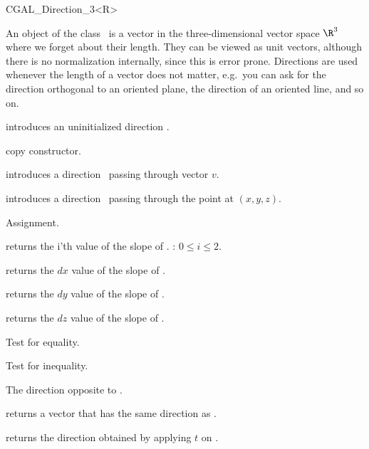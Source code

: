 
\begin {classtemplate} {CGAL_Direction_3<R>}

An object of the class \classname\ is a vector in the three-dimensional 
vector space $\R^3$  where we forget about their length. They can be
viewed as unit vectors, although there is no normalization internally,
since this is error prone.  Directions are used whenever the length of
a vector does not matter, e.g.\ you can ask for the direction
orthogonal to an oriented plane, the direction of an oriented line,
and so on. 

\creation
{}


\hidden {}
             {introduces an uninitialized direction \var.}

\hidden {}
 	    {copy constructor.}

	    {introduces a direction \var\ passing through vector $v$.}

            {introduces a direction \var\ passing through the point 
             at $(x, y, z)$.}


\operations
\threecolumns{5cm}{4cm}

\hidden {}
        {Assignment.}

       {returns the i'th value of the slope of \var.
        \precond: $0 \leq i \leq 2$.}

       {returns the $dx$ value of the slope of \var.}

       {returns the $dy$ value of the slope of \var.}

       {returns the $dz$ value of the slope of \var.}


       {Test for equality.}

       {Test for inequality.}


       {The direction opposite to \var.}

       {returns a vector that has the same direction as \var.}

       {returns the direction obtained by applying $t$ on \var.}



\end {classtemplate} 

%
%
%
